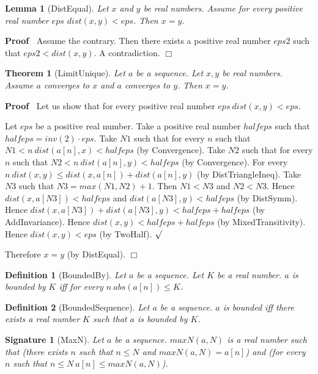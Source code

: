 \documentclass{article}
\newenvironment{forthel}{\begin{leftbar}}{\end{leftbar}}
\newenvironment{proof}{\noindent\textbf{Proof\ }}{\hspace*{\fill}$\Box$\medskip}
\newenvironment{subproof}{\begin{list}{}{}
		\item[\text{Proof}]}{\hfill $\surd$ \end{list}}
\newtheorem{lemma}{Lemma}
\newtheorem{theorem}{Theorem}
\newtheorem{definition}{Definition}
\newtheorem{signature}{Signature}
\begin{document}
\begin{forthel}
	\begin{lemma}[DistEqual]
	Let $x$ and $y$ be real numbers. Assume for every positive real number $eps$ $dist(x,y) < eps$.
	Then $x = y$.
	\end{lemma}
	\begin{proof}
	Assume the contrary.
	Then there exists a positive real number $eps2$ such that $eps2 < dist(x,y)$.
	A contradiction.
	\end{proof}
	
	\begin{theorem}[LimitUnique]
	Let $a$ be a sequence. Let $x, y$ be real numbers. Assume $a$ converges to $x$ and $a$ converges to $y$.
	Then $x = y$.
	\end{theorem}
	\begin{proof}
	Let us show that for every positive real number $eps \ dist(x,y) < eps$.
	\begin{subproof}
	Let $eps$ be a positive real number.
	Take a positive real number $halfeps$ such that $halfeps = inv(2) \cdot eps$.
	Take $N1$ such that for every $n$ such that $N1 < n \ dist(a[n],x) < halfeps$ (by Convergence).
	Take $N2$ such that for every $n$ such that $N2 < n \ dist(a[n],y) < halfeps$ (by Convergence).
	For every $n \ dist(x,y) \leq dist(x,a[n]) + dist(a[n],y)$ (by DistTriangleIneq). 
	Take $N3$ such that $N3 = max(N1,N2) + 1$.
	Then $N1 < N3$ and $N2 < N3$.
	Hence $dist(x,a[N3]) < halfeps$ and $dist(a[N3],y) < halfeps$ (by DistSymm).
	Hence $dist(x,a[N3]) + dist(a[N3],y) < halfeps + halfeps$ (by AddInvariance).
	Hence $dist(x,y) < halfeps + halfeps$ (by MixedTransitivity).
	Hence $dist(x,y) < eps$ (by TwoHalf).
	\end{subproof}
	Therefore $x = y$ (by DistEqual).
	\end{proof}
	
	\begin{definition}[BoundedBy]
	Let $a$ be a sequence. Let $K$ be a real number. $a$ is bounded by $K$ iff
	for every $n \ abs(a[n]) \leq K$.
	\end{definition}
	
	\begin{definition}[BoundedSequence]
	Let $a$ be a sequence. $a$ is bounded iff there exists a real number $K$ such that
	$a$ is bounded by $K$.
	\end{definition}
	
	\begin{signature}[MaxN]
	Let $a$ be a sequence. $maxN(a,N)$ is a real number such that
	(there exists $n$ such that $n \leq N$ and $maxN(a,N) = a[n]$) and
	(for every $n$ such that $n \leq N \ a[n] \leq maxN(a,N)$).
	\end{signature}
	

\end{forthel}
\end{document}
